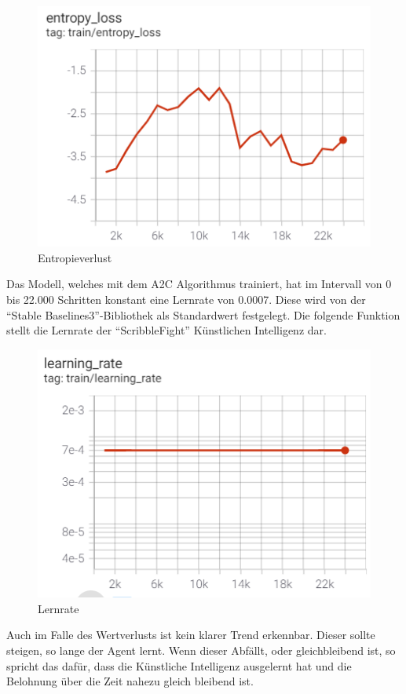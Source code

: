 \begin{figure}[H]
    \centering
    \includegraphics[scale=0.7]{pics/Tensorboard/A2C/entropy_loss.png}
    \caption{Entropieverlust}
    \label{fig:a2c:entropyloss}
\end{figure}


Das Modell, welches mit dem A2C Algorithmus trainiert, hat im Intervall von 0 bis 22.000 Schritten
konstant eine Lernrate von 0.0007. Diese wird von der ``Stable Baselines3''-Bibliothek als Standardwert
festgelegt.
Die folgende Funktion stellt die Lernrate der ``ScribbleFight'' Künstlichen Intelligenz dar.

\begin{figure}[H]
    \centering
    \includegraphics[scale=0.7]{pics/Tensorboard/A2C/learning_rate.png}
    \caption{Lernrate}
    \label{fig:a2c:learningrate}
\end{figure}

Auch im Falle des Wertverlusts ist kein klarer Trend erkennbar.
Dieser sollte steigen, so lange der Agent lernt. Wenn dieser Abfällt, oder gleichbleibend ist,
so spricht das dafür, dass die Künstliche Intelligenz ausgelernt hat und die Belohnung über die Zeit
nahezu gleich bleibend ist.

